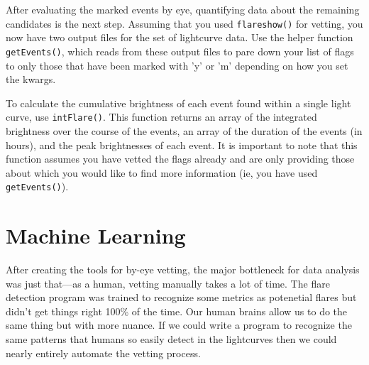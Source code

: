 \documentclass{article}
\begin{document}
After evaluating the marked events by eye, quantifying data about the
remaining candidates is the next step.  Assuming that you used
\verb|flareshow()| for vetting, you now have two output files for the
set of lightcurve data.  Use the helper function \verb|getEvents()|,
which reads from these output files to pare down your list of flags to
only those that have been marked with 'y' or 'm' depending on how you
set the kwargs.

To calculate the cumulative brightness of each event found within a
single light curve, use \verb|intFlare()|.  This function returns an
array of the integrated brightness over the course of the events, an
array of the duration of the events (in hours), and the peak
brightnesses of each event.  It is important to note that this
function assumes you have vetted the flags already and are only
providing those about which you would like to find more information
(ie, you have used \verb|getEvents()|).


\section{Machine Learning}
\label{sec:ml}

After creating the tools for by-eye vetting, the major bottleneck for
data analysis was just that---as a human, vetting manually takes a lot
of time.  The flare detection program was trained to recognize some
metrics as potenetial flares but didn't get things right 100\% of the
time.  Our human brains allow us to do the same thing but with more
nuance.  If we could write a program to recognize the same patterns
that humans so easily detect in the lightcurves then we could nearly
entirely automate the vetting process.
\end{document}
